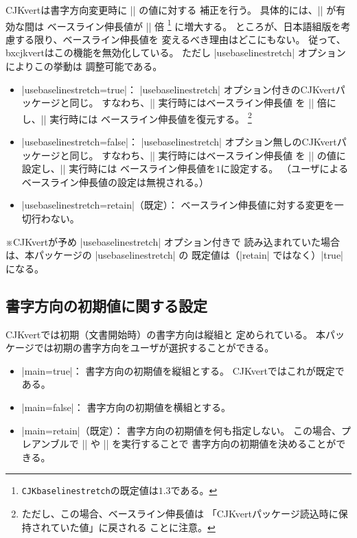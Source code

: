 \documentclass[a4paper]{ltjsarticle}
\newcommand{\Pkg}[1]{\textsf{#1}}
\newcommand{\Note}{\par\noindent ※}
\newcommand{\Means}{：\quad}
\newcommand{\Cs}[1]{\texttt{\symbol{`\\}#1}}
\begin{document}
\Pkg{CJKvert}は書字方向変更時に |\baselinestretch| の値に対する
補正を行う。
具体的には、|\CJKvert| が有効な間は
ベースライン伸長値が |\CJKbaselinestretch| 倍
\footnote{\Cs{CJKbaselinestretch}の既定値は$1.3$である。}
に増大する。
ところが、日本語組版を考慮する限り、ベースライン伸長値を
変えるべき理由はどこにもない。
従って、\Pkg{bxcjkvert}はこの機能を無効化している。
ただし |usebaselinestretch| オプションによりこの挙動は
調整可能である。


\begin{itemize}
\item |usebaselinestretch=true|\Means
  |usebaselinestretch| オプション付きの\Pkg{CJKvert}パッケージと同じ。
  すなわち、|\CJKvert| 実行時にはベースライン伸長値
  を |\CJKbaselinestretch| 倍にし、|\CJKhorz| 実行時には
  ベースライン伸長値を復元する。%
  \footnote{ただし、この場合、ベースライン伸長値は
  「\Pkg{CJKvert}パッケージ読込時に保持されていた値」に戻される
  ことに注意。}
\item |usebaselinestretch=false|\Means
  |usebaselinestretch| オプション無しの\Pkg{CJKvert}パッケージと同じ。
  すなわち、|\CJKvert| 実行時にはベースライン伸長値
  を |\CJKbaselinestretch| の値に設定し、|\CJKhorz| 実行時には
  ベースライン伸長値を$1$に設定する。
  （ユーザによるベースライン伸長値の設定は無視される。）
\item |usebaselinestretch=retain|（既定）\Means
  ベースライン伸長値に対する変更を一切行わない。
\end{itemize}

\Note \Pkg{CJKvert}が予め |usebaselinestretch| オプション付きで
読み込まれていた場合は、本パッケージの |usebaselinestretch| の
既定値は（|retain| ではなく）|true| になる。

\subsection{書字方向の初期値に関する設定}

\Pkg{CJKvert}では初期（文書開始時）の書字方向は縦組と
定められている。
本パッケージでは初期の書字方向をユーザが選択することができる。

\begin{itemize}
\item |main=true|\Means
  書字方向の初期値を縦組とする。
  \Pkg{CJKvert}ではこれが既定である。
\item |main=false|\Means
  書字方向の初期値を横組とする。
\item |main=retain|（既定）\Means
  書字方向の初期値を何も指定しない。
  この場合、プレアンブルで |\CJKvert| や |\CJKhorz| を実行することで
  書字方向の初期値を決めることができる。
\end{itemize}

\end{document}
